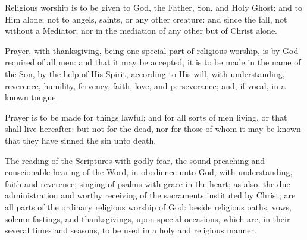 \begin{outerlst}[left=0pt,labelsep=0pt]
\begin{innerlst}[resume*]
\item Religious worship is to be given to God, the Father, Son, and Holy Ghost; and to Him alone; not to angels, saints, or any other creature: and since the fall, not without a Mediator; nor in the mediation of any other but of Christ alone.   

\item Prayer, with thanksgiving, being one special part of religious worship, is by God required of all men: and that it may be accepted, it is to be made in the name of the Son, by the help of His Spirit, according to His will, with understanding, reverence, humility, fervency, faith, love, and perseverance; and, if vocal, in a known tongue.   

\item Prayer is to be made for things lawful; and for all sorts of men living, or that shall live hereafter: but not for the dead, nor for those of whom it may be known that they have sinned the sin unto death.   

\item The reading of the Scriptures with godly fear, the sound preaching and conscionable hearing of the Word, in obedience unto God, with understanding, faith and reverence; singing of psalms with grace in the heart; as also, the due administration and worthy receiving of the sacraments instituted by Christ; are all parts of the ordinary religious worship of God: beside religious oaths, vows, solemn fastings, and thanksgivings, upon special occasions, which are, in their several times and seasons, to be used in a holy and religious manner.   


\end{innerlst}
\end{outerlst}
